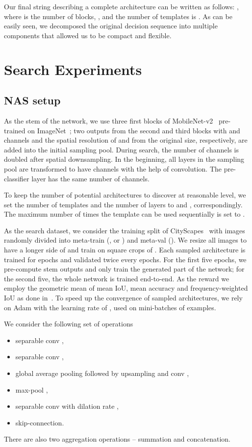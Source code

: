 \documentclass[10pt,twocolumn,letterpaper]{article}
\begin{document}
Our final string describing a complete architecture can be written as follows:
, where  is the number of blocks, , and the number of templates is . As can be easily seen, we decomposed the original decision sequence into multiple components that allowed us to be compact and flexible.

\section{Search Experiments}

\subsection{NAS setup}
\label{nas:setup}
As the stem of the network, we use three first blocks of MobileNet-v2~\cite{abs-1801-04381} pre-trained on ImageNet~\cite{RussakovskyDSKS15}; two outputs from the second and third blocks with  and  channels and the spatial resolution of  and  from the original size, respectively, are added into the initial sampling pool. During search, the number of channels is doubled after spatial downsampling. In the beginning, all layers in the sampling pool are transformed to have  channels with the help of  convolution. The pre-classifier layer has the same number of  channels.

To keep the number of potential architectures to discover at reasonable level, we set the number of templates and the number of layers to  and , correspondingly. The maximum number of times the template can be used sequentially is set to .

As the search dataset, we consider the training split of CityScapes~\cite{CordtsORREBFRS16} with  images randomly divided into meta-train (, or ) and meta-val (). We resize all images to have a longer side of  and train on square crops of . Each sampled architecture is trained for  epochs and validated twice every  epochs. For the first five epochs, we pre-compute stem outputs and only train the generated part of the network; for the second five, the whole network is trained end-to-end. As the reward we employ the geometric mean of mean IoU, mean accuracy and frequency-weighted IoU as done in~\cite{abs-1810-10804}. To speed up the convergence of sampled architectures, we rely on Adam with the learning rate of , used on mini-batches of  examples.


We consider the following set of operations
\begin{itemize}
	\itemsep -.122cm
	\item separable conv ,
	\item separable conv ,
	\item global average pooling followed by upsampling and conv ,
	\item max-pool ,
	\item separable conv  with dilation rate ,
	\item skip-connection.
\end{itemize}
There are also two aggregation operations -- summation and concatenation.
\end{document}
